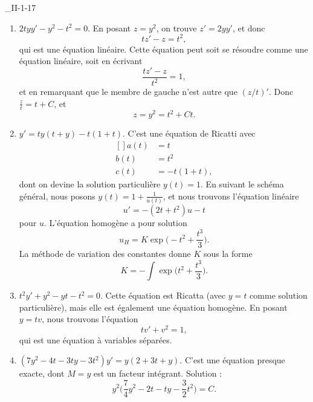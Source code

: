 \begin{corrige}{_II-1-17}
\begin{enumerate}
\item
$2tyy'-y^2-t^2=0$. En posant $z=y^2$, on trouve $z'=2yy'$, et donc
\begin{equation}
	tz'-z=t^2,
\end{equation}
qui est une équation linéaire. Cette équation peut soit se résoudre comme une équation linéaire, soit en écrivant
\begin{equation}
	\frac{ tz'-z }{ t^2 }=1,
\end{equation}
et en remarquant que le membre de gauche n'est autre que $(z/t)'$. Donc $\frac{ z }{ t }=t+C$, et
\begin{equation}
	z=y^2=t^2+Ct.
\end{equation}

\item
$y'=ty(t+y)-t(1+t)$. C'est une équation de Ricatti avec
\begin{equation}
	\begin{aligned}[]
		a(t)&=t\\
		b(t)&=t^2\\
		c(t)&=-t(1+t),
	\end{aligned}
\end{equation}
dont on devine la solution particulière $y(t)=1$. En suivant le schéma général, nous posons $y(t)=1+\frac{1}{ u(t) }$, et nous trouvons l'équation linéaire
\begin{equation}
	u'=-(2t+t^2)u-t
\end{equation}
pour $u$. L'équation homogène a pour solution
\begin{equation}
	u_H=K\exp\big( -t^2+\frac{ t^3 }{ 3 } \big).
\end{equation}
La méthode de variation des constantes donne $K$ sous la forme
\begin{equation}
	K=-\int \exp\big( t^2+\frac{ t^3 }{ 3 } \big).
\end{equation}

\item
$t^2y'+y^2-yt-t^2=0$.
Cette équation est Ricatta (avec $y=t$ comme solution particulière), mais elle est également une équation homogène. En posant $y=tv$, nous trouvons l'équation
\begin{equation}
	tv'+v^2=1,
\end{equation}
qui est une équation à variables séparées.

\item
$(7y^2-4t-3ty-3t^2)y'=y(2+3t+y)$. C'est une équation presque exacte, dont $M=y$ est un facteur intégrant. Solution :
\begin{equation}
	y^2\big( \frac{ 7 }{ 4 }y^2-2t-ty-\frac{ 3 }{ 2 }t^2 \big)=C.
\end{equation}


\end{enumerate}
\end{corrige}
